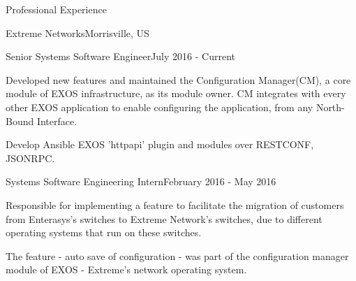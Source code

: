 \documentclass{resume} %
\begin{document}
\begin{rSection}{Professional Experience}

	\begin{rSubsectionCompany}{Extreme Networks}{Morrisville, US}
        \begin{comment}
            \item Periodic configuration auto-save.
            \item Optimize configuration save/show.
            \item SNMP request queuing and MIB bugs.
            \item CLI usability enhancements.
            \item MLAG orchestration mode.
            \item Improve identification of faulty applications.
            \item Restconf Openconfig Implementation.
            \item Configuration diff.
            \item Standalone system represented as Slotted system.
            \item JSONRPC, RESTCONF, Ansible.
            \item Documentation, and Unit Tests.
            \item CI/CD - Jenkins, Packer, Vagrant, Docker, 
        \end{comment}
	    \begin{rSubsectionCompanyRole}{Senior Systems Software Engineer}{July 2016 - Current}
	        \item Developed new features and maintained the Configuration Manager(CM), a core module of EXOS infrastructure, as its module owner. CM integrates with every other EXOS application to enable configuring the application, from any North-Bound Interface.
	        \item Develop Ansible EXOS 'httpapi' plugin and modules over RESTCONF, JSONRPC.
	    \end{rSubsectionCompanyRole}
	    
	    \begin{rSubsectionCompanyRole}{Systems Software Engineering Intern}{February 2016 - May 2016}
            \item Responsible for implementing a feature to facilitate the migration of customers from Enterasys's switches to Extreme Network's switches, due to different operating systems that run on these switches.
        	\item The feature - auto save of configuration - was part of the configuration manager module of EXOS - Extreme's network operating system.
	    \end{rSubsectionCompanyRole}
	\end{rSubsectionCompany}


\end{rSection}
\end{document}
